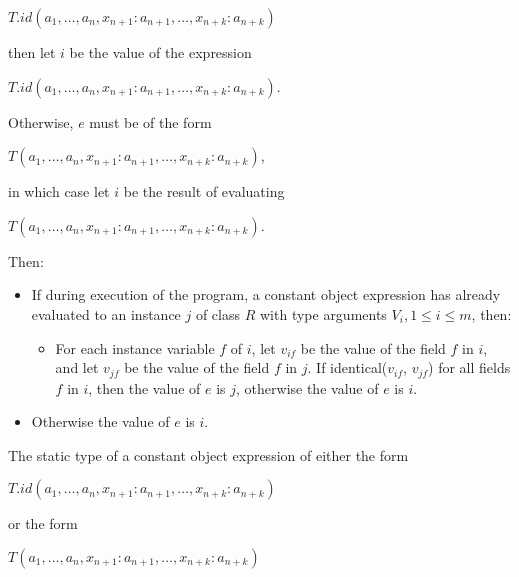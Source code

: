 \documentclass{article}
\newcommand{\code}[1]{{\sf #1}}
\begin{document}
\CONST{} $T.id(a_1, \ldots , a_n, x_{n+1}: a_{n+1}, \ldots , x_{n+k}: a_{n+k})$

then let $i$ be the value of the expression

\NEW{} $T.id(a_1, \ldots , a_n, x_{n+1}: a_{n+1}, \ldots , x_{n+k}: a_{n+k})$.

\LMHash{}
Otherwise, $e$ must be of the form

\CONST{} $T(a_1, \ldots , a_n, x_{n+1}: a_{n+1}, \ldots , x_{n+k}: a_{n+k})$,

in which case let $i$ be the result of evaluating

\NEW{} $T(a_1, \ldots , a_n, x_{n+1}: a_{n+1}, \ldots , x_{n+k}: a_{n+k})$.

\LMHash{}
Then:
\begin{itemize}
\item If during execution of the program, a constant object expression has already evaluated to an instance $j$ of class $R$ with type arguments $V_i, 1 \le i \le m$, then:
\begin{itemize}
\item For each instance variable $f$ of $i$, let $v_{if}$ be the value of the field $f$ in $i$, and let $v_{jf}$ be the value of the field $f$ in $j$. If  \code{identical($v_{if}$, $v_{jf}$)} for all fields $f$ in $i$, then the value of $e$ is $j$, otherwise the value of $e$ is $i$.
\end{itemize}
\item Otherwise the value of $e$ is $i$.
\end{itemize}


\LMHash{}
The static type of a constant object expression of either the form

\CONST{} $T.id(a_1, \ldots , a_n, x_{n+1}: a_{n+1}, \ldots , x_{n+k}: a_{n+k})$

or the form

\CONST{} $T(a_1, \ldots , a_n, x_{n+1}: a_{n+1}, \ldots , x_{n+k}: a_{n+k})$
\end{document}
